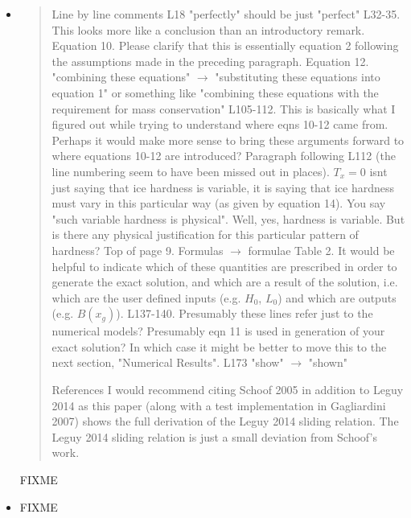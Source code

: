 \documentclass[11pt,reqno]{amsart}
\begin{document}
\begin{itemize}
\item  \begin{quote}
Line by line comments
L18 "perfectly" should be just "perfect"
L32-35. This looks more like a conclusion than an introductory remark.
Equation 10. Please clarify that this is essentially equation 2 following the assumptions made in the preceding paragraph.
Equation 12. "combining these equations" $\to$ "substituting these equations into equation 1" or something like "combining these equations with the requirement for mass conservation"
L105-112. This is basically what I figured out while trying to understand where eqns 10-12 came from. Perhaps it would make more sense to bring these arguments forward to where equations 10-12 are introduced?
Paragraph following L112 (the line numbering seem to have been missed out in places). $T_x=0$ isnt just saying that ice hardness is variable, it is saying that ice hardness must vary in this particular way (as given by equation 14). You say "such variable hardness is physical". Well, yes, hardness is variable. But is there any physical justification for this particular pattern of hardness?
Top of page 9. Formulas $\to$ formulae
Table 2. It would be helpful to indicate which of these quantities are prescribed in order to generate the exact solution, and which are a result of the solution, i.e. which are the user defined inputs (e.g. $H_0$, $L_0$) and which are outputs (e.g. $B(x_g)$).
L137-140. Presumably these lines refer just to the numerical models? Presumably eqn 11 is used in generation of your exact solution? In which case it might be better to move this to the next section, "Numerical Results".
L173 "show" $\to$ "shown"

References
I would recommend citing Schoof 2005 in addition to Leguy 2014 as this paper (along with a test implementation in Gagliardini 2007) shows the full derivation of the Leguy 2014 sliding relation. The Leguy 2014 sliding relation is just a small deviation from Schoof's work.
\end{quote}

\noindent FIXME


\item  \begin{quote}

\end{quote}

\noindent FIXME


\end{itemize}


%
%
\end{document}
